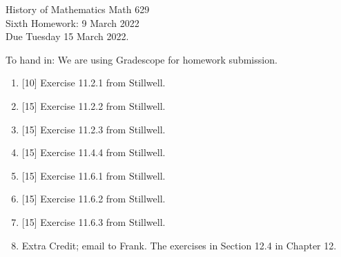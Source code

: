 \documentclass[12pt]{article}
\begin{document}
\LARGE 
\noindent
{\color{Maroon}History of Mathematics \hfill Math 629}\vspace{2pt}\\
\large
Sixth Homework: \hfill 9 March 2022\\
Due Tuesday 15 March 2022.
\normalsize\vspace{10pt}

To hand in: We are using Gradescope for homework submission.


\begin{enumerate}

\item  {[10]}
     Exercise 11.2.1 from Stillwell.

\item  {[15]}
     Exercise 11.2.2 from Stillwell.

\item  {[15]}
     Exercise 11.2.3 from Stillwell.

\item  {[15]}
     Exercise 11.4.4 from Stillwell.

\item  {[15]}
     Exercise 11.6.1 from Stillwell.

\item  {[15]}
     Exercise 11.6.2 from Stillwell.

\item  {[15]}
     Exercise 11.6.3 from Stillwell.

   \item Extra Credit; email to Frank. The exercises in Section 12.4 in Chapter 12.
 \end{enumerate}
\end{document}
